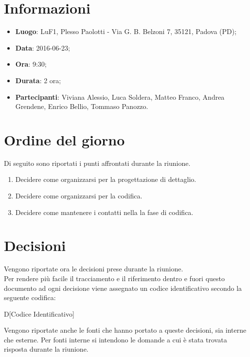 \documentclass[a4paper,titlepage]{article}
\begin{document}
\maketitle

\begin{diario}
\end{diario}

\newpage
\tableofcontents

\newpage
\section{Informazioni}
\label{sec:Informazioni}

\begin{itemize}
 \item \textbf{Luogo}: LuF1, Plesso Paolotti - Via G. B. Belzoni 7, 35121, Padova (PD);
 \item \textbf{Data}: 2016-06-23;
 \item \textbf{Ora}: 9:30;
 \item \textbf{Durata}: 2 ora;
 \item \textbf{Partecipanti}: Viviana Alessio, Luca Soldera, Matteo Franco, Andrea Grendene, Enrico Bellio, Tommaso Panozzo.
\end{itemize}

\section{Ordine del giorno}
\label{sec:Ordine del giorno}
Di seguito sono riportati i punti affrontati durante la riunione.

\begin{enumerate}
	\item Decidere come organizzarsi per la progettazione di dettaglio.
	\item Decidere come organizzarsi per la codifica.
	\item Decidere come mantenere i contatti nella la fase di codifica.
\end{enumerate}

\section{Decisioni}
Vengono riportate ora le decisioni prese durante la riunione. \\
Per rendere più facile il tracciamento e il riferimento dentro e fuori questo documento ad ogni decisione viene assegnato un codice identificativo secondo la seguente codifica:
\begin{center}
D[Codice Identificativo]
\end{center}
Vengono riportate anche le fonti che hanno portato a queste decisioni, sia interne che esterne. Per fonti interne si intendono le domande a cui è stata trovata risposta durante la riunione.
\end{document}
